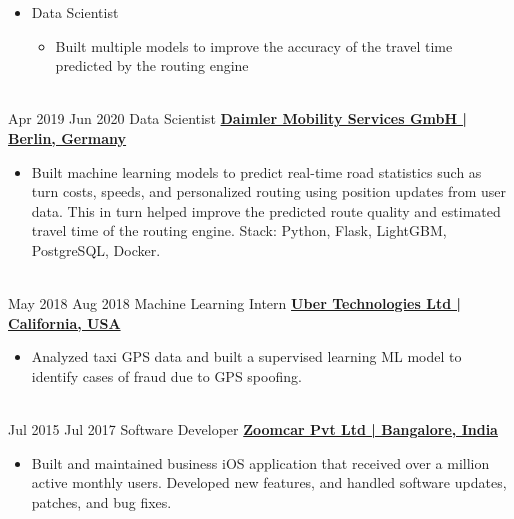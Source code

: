 \documentclass[letterpaper]{DS_class_file} %
\begin{document}
\begin{twenty}
{\begin{itemize}
\begin{itemize}
            \end{itemize}
        \item Data Scientist
            \begin{itemize}
             \item Built multiple models to improve the accuracy of the travel time predicted by the routing engine
            \end{itemize}
		\end{itemize}}
		\\
	\twentyitem
		{Apr 2019}
		{Jun 2020}
		{\hspace{0.3cm}Data Scientist}
		{\href{https://www.mercedes-benz-mobility.com/en/}{\textbf{Daimler Mobility Services GmbH | Berlin, Germany}}}
		{}
		{\begin{itemize}
			\item Built machine learning models to predict real-time road statistics such as turn costs, speeds, and personalized routing using position updates from user data. This in turn helped improve the predicted route quality and estimated travel time of the routing engine.
            \newline Stack: Python, Flask, LightGBM, PostgreSQL, Docker.
		\end{itemize}}
		\\
	\twentyitem
		{May 2018}
		{Aug 2018}
		{\hspace{0.3cm}Machine Learning Intern}
		{\href{https://www.uber.com/}{\textbf{Uber Technologies Ltd | California, USA}}}
		{}
		{\begin{itemize}
			\item Analyzed taxi GPS data and built a supervised learning ML model to identify cases of fraud due to GPS spoofing.
		\end{itemize}}
		\\
	\twentyitem
		{Jul 2015}
		{Jul 2017}
		{\hspace{0.3cm}Software Developer}
		{\href{http://www.organonanalytics.com/pages/index.php}{\textbf{Zoomcar Pvt Ltd | Bangalore, India}}}
		{}
		{\begin{itemize}
			\item Built and maintained business iOS application that received over a million active monthly users. Developed new features, and handled software updates, patches, and bug fixes.
		\end{itemize}}
		\\
\end{twenty}
\end{document}
